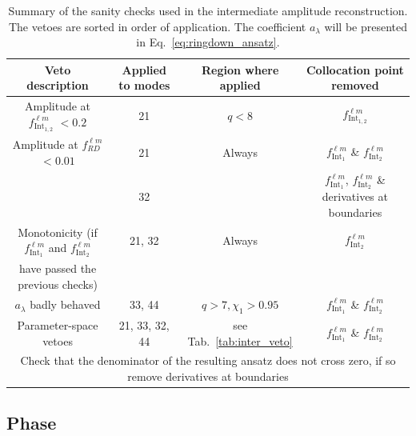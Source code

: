 \documentclass[twocolumn,prd,aps,superscriptaddress,preprintnumbers,tightenlines,showpacs,nofootinbib,eqsecnum,amsfonts,amsmath]{revtex4}
\begin{document}
\begin{table}[htbp]
\caption{Summary of the sanity checks used in the intermediate amplitude reconstruction. The vetoes are sorted in order of application. The coefficient $a_{\lambda}$ will be presented in Eq.~\ref{eq:ringdown_ansatz}.}
\label{tab:inter_veto_summary}
\begin{tabular}{| c | c | c | c |}
\hline
Veto description &  Applied to modes & Region where applied  &  Collocation point removed  \\  
\hline
\hline                        
Amplitude at  $f_\mathrm{Int_{1,2}}^{\ell m}$ $<0.2$ &  21 & $q<8$  &  $f_\mathrm{Int_{1,2}}^{\ell m}$   \\
\hline
Amplitude at $f^{\ell m}_{RD}$ $<0.01$ & 21 & Always  &  $f_{\mathrm{Int_1}}^{\ell m}$ \& $f_{\mathrm{Int_2}}^{\ell m}$   \\
 &  32 & & $f_{\mathrm{Int_1}}^{\ell m}$, $f_{\mathrm{Int_2}}^{\ell m}$ \& derivatives at boundaries \\
\hline
Monotonicity (if $f_{\mathrm{Int_1}}^{\ell m}$ and $f_{\mathrm{Int_2}}^{\ell m}$ &  21, 32 & Always  & $f_{\mathrm{Int_2}}^{\ell m}$  \\have passed the previous checks) &   &   &   \\
\hline
$a_{\lambda}$ badly behaved & 33, 44 & $q>7, \chi_1>0.95$  &  $f_{\mathrm{Int_1}}^{\ell m}$ \& $f_{\mathrm{Int_2}}^{\ell m}$ \\
\hline
Parameter-space vetoes & 21, 33, 32, 44 & see Tab.~\ref{tab:inter_veto} &  $f_{\mathrm{Int_1}}^{\ell m}$ \& $f_{\mathrm{Int_2}}^{\ell m}$   \\
\hline
\hline
\multicolumn{4}{|c|}{Check that the denominator of the resulting ansatz does not cross zero, if so remove derivatives at boundaries}
\\
\hline
\end{tabular}
\end{table}




\subsection{Phase} 
\label{subsec:phase_intermediate}
\end{document}
